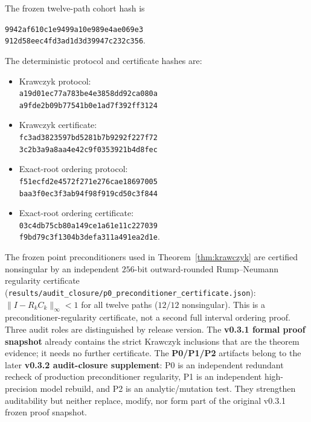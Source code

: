 The frozen twelve-path cohort hash is
\begin{center}
\footnotesize\texttt{9942af610c1e9499a10e989e4ae069e3}\\
\footnotesize\texttt{912d58eec4fd3ad1d3d39947c232c356}.
\end{center}
The deterministic protocol and certificate hashes are:
\begin{itemize}[itemsep=0.1em]
\item Krawczyk protocol:\\
\footnotesize\texttt{a19d01ec77a783be4e3858dd92ca080a}\\
\footnotesize\texttt{a9fde2b09b77541b0e1ad7f392ff3124}
\item Krawczyk certificate:\\
\footnotesize\texttt{fc3ad3823597bd5281b7b9292f227f72}\\
\footnotesize\texttt{3c2b3a9a8aa4e42c9f0353921b4d8fec}
\item Exact-root ordering protocol:\\
\footnotesize\texttt{f51ecfd2e4572f271e276cae18697005}\\
\footnotesize\texttt{baa3f0ec3f3ab94f98f919cd50c3f844}
\item Exact-root ordering certificate:\\
\footnotesize\texttt{03c4db75cb80a149ce1a61e11c227039}\\
\footnotesize\texttt{f9bd79c3f1304b3defa311a491ea2d1e}.
\end{itemize}

\begin{remark}[Role of P0/P1/P2]\label{rem:p0role}
The frozen point preconditioners used in Theorem~\ref{thm:krawczyk} are certified
nonsingular by an independent $256$-bit outward-rounded Rump--Neumann regularity
certificate (\nolinkurl{results/audit_closure/p0_preconditioner_certificate.json}):
$\lVert I-R_{k}C_{k}\rVert_{\infty}<1$ for all twelve paths ($12/12$ nonsingular). This is
a preconditioner-regularity certificate, not a second full interval ordering proof. Three
audit roles are distinguished by release version. The \textbf{v0.3.1 formal proof snapshot}
already contains the strict Krawczyk inclusions that are the theorem evidence; it needs no
further certificate. The \textbf{P0/P1/P2} artifacts belong to the later \textbf{v0.3.2
audit-closure supplement}: P0 is an independent redundant recheck of production
preconditioner regularity, P1 is an independent high-precision model rebuild, and P2 is an
analytic/mutation test. They strengthen auditability but neither replace, modify, nor form
part of the original v0.3.1 frozen proof snapshot.
\end{remark}

